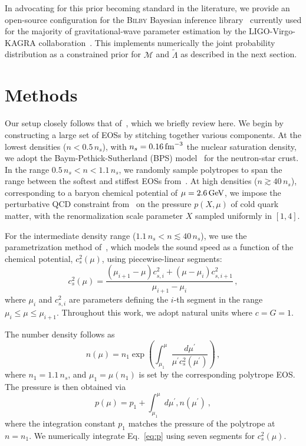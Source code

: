\documentclass[twocolumn]{aastex631}
\begin{document}
In advocating for this prior becoming standard in the literature, we provide an open-source configuration for the \textsc{Bilby} Bayesian inference library~\citep{ashton19,romeroshaw20} currently used for the majority of gravitational-wave parameter estimation by the LIGO-Virgo-KAGRA collaboration~\citep{LIGO, Virgo, KAGRA}.
This implements numerically the joint probability distribution as a constrained prior for $\mathcal{M}$ and $\tilde{\Lambda}$ as described in the next section.
	
\section{Methods} \label{sec:Methods}
	
Our setup closely follows that of~\citet{Altiparmak:2022}, which we briefly review here. 
We begin by constructing a large set of EOSs by stitching together various components.
At the lowest densities ($n<0.5\,n_s$), with $n_s=0.16\,{\rm fm}^{-3}$ the nuclear saturation density, we adopt the Baym-Pethick-Sutherland (BPS) model~\citep{Baym71} for the neutron-star crust.
In the range $0.5\,n_s < n < 1.1\,n_s$, we randomly sample polytropes to span the range between the softest and stiffest EOSs from~\citet{Hebeler:2013nza}.
At high densities ($n \gtrsim 40\,n_s$), corresponding to a baryon chemical potential of $\mu = 2.6\,\rm GeV$, we impose the perturbative QCD constraint from~\citet{Fraga2014} on the pressure $p(X, \mu)$ of cold quark matter, with the renormalization scale parameter $X$ sampled uniformly in $[1,4]$.
	
For the intermediate density range ($1.1\,n_s < n \lesssim 40\,n_s$), we use the parametrization method of~\citet{Annala2019}, which models the sound speed as a function of the chemical potential, $c_s^2(\mu)$, using piecewise-linear segments:
\begin{equation} \label{eq:cs2}
 c_s^2(\mu) = \frac{\left(\mu_{i+1}-\mu \right) c_{s,i}^2 + \left(\mu - \mu_i \right) c_{s,i+1}^2}{\mu_{i+1}-\mu_i}\,, 
\end{equation}
where $\mu_i$ and $c_{s,i}^2$ are parameters defining the $i$-th segment in the range $\mu_i \leq \mu \leq \mu_{i+1}$.
Throughout this work, we adopt natural units where $c=G=1$.

The number density follows as 
\begin{equation} \label{eq:n}
 n(\mu) = n_1 \exp \left({\int_{\mu_1}^\mu \frac{d\mu^\prime}{\mu^\prime c_s^2(\mu^\prime)}}\right)\,, 
\end{equation} 
where $n_1 = 1.1\,n_s$, and $\mu_1 = \mu(n_1)$ is set by the corresponding polytrope EOS.
The pressure is then obtained via
\begin{equation} \label{eq:p}
 p(\mu) = p_1 + \int_{\mu_1}^\mu d\mu^\prime , n(\mu^\prime)~,
\end{equation}
where the integration constant $p_1$ matches the pressure of the polytrope at $n = n_1$.
We numerically integrate Eq.~\eqref{eq:p} using seven segments for $c_s^2(\mu)$.
\end{document}
